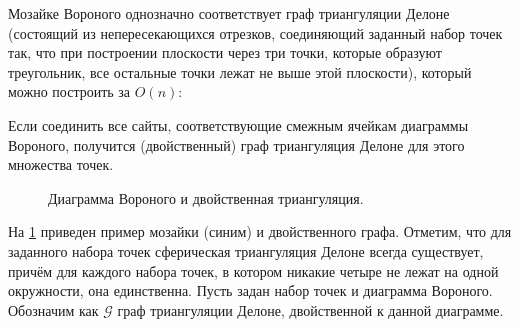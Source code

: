 Мозайке Вороного однозначно соответствует граф триангуляции Делоне (состоящий из непересекающихся отрезков, соединяющий заданный набор точек так, что при построении плоскости через три точки, которые образуют треугольник, все остальные точки лежат не выше этой плоскости), который можно построить за $O(n)$:

\begin{theorem1}
Если соединить все сайты, соответствующие смежным ячейкам диаграммы Вороного, получится (двойственный) граф триангуляция Делоне для этого множества точек.
\end{theorem1}

\begin{figure}[h]
\centering
\captionsetup{justification=centering}
\caption{Диаграмма Вороного и двойственная триангуляция.}
\label{chapter1:fig:triangexample}
\end{figure}

На \figurename{ \ref{chapter1:fig:triangexample}} приведен пример мозайки (синим) и двойственного графа.
Отметим, что для заданного набора точек сферическая триангуляция Делоне всегда существует, причём для каждого набора точек, в котором никакие четыре не лежат на одной окружности, она единственна.
Пусть задан набор точек и диаграмма Вороного. Обозначим как $\mathcal{G}$ граф триангуляции Делоне, двойственной к данной диаграмме. 

